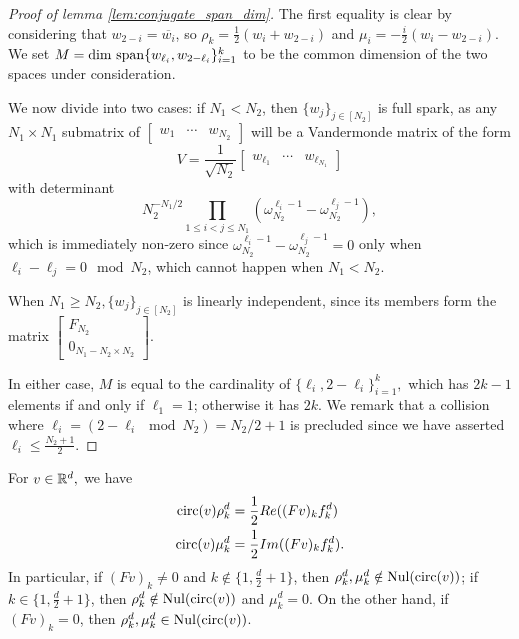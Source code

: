\begin{proof}[Proof of lemma \ref{lem:conjugate_span_dim}]

The first equality is clear by considering that $w_{2 - i} = \overline{w_i}$, so $\rho_k = \frac{1}{2}(w_i + w_{2-i})$ and $\mu_i = -\frac{i}{2}(w_i - w_{2 - i})$.  We set $M = \dim\,\operatorname{span}\{w_{\ell_i}, w_{2 - \ell_i}\}_{i = 1}^k$ to be the common dimension of the two spaces under consideration.

We now divide into two cases: if $N_1 < N_2$, then $\{w_j\}_{j \in [N_2]}$ is full spark, as any $N_1 \times N_1$ submatrix of $\begin{bmatrix} w_1 & \cdots & w_{N_2} \end{bmatrix}$ will be a Vandermonde matrix of the form \[V = \frac{1}{\sqrt{N_2}}\begin{bmatrix} w_{\ell_1} & \cdots & w_{\ell_{N_1}} \end{bmatrix}\] with determinant \[N_2^{-N_1 / 2}\prod_{1 \le i < j \le N_1} (\omega_{N_2}^{\ell_i - 1} - \omega_{N_2}^{\ell_j - 1}),\] which is immediately non-zero since $\omega_{N_2}^{\ell_i - 1} - \omega_{N_2}^{\ell_j - 1} = 0$ only when $\ell_i - \ell_j = 0 \mod N_2$, which cannot happen when $N_1 < N_2$.

When $N_1 \ge N_2, \{w_j\}_{j \in [N_2]}$ is linearly independent, since its members form the matrix $\begin{bmatrix} F_{N_2} \\ 0_{N_1 - N_2 \times N_2} \end{bmatrix}$.

In either case, $M$ is equal to the cardinality of $\{\ell_i, 2 - \ell_i\}_{i = 1}^k,$ which has $2k - 1$ elements if and only if $\ell_1 = 1$; otherwise it has $2k$.  We remark that a collision where $\ell_i = (2 - \ell_i \mod N_2) = N_2 / 2 + 1$ is precluded since we have asserted $\ell_i \le \frac{N_2 + 1}{2}$.

\end{proof}

\begin{lemma}
  For $v \in \mathbb{R}^d,$ we have \begin{align} \operatorname{circ}(v) \rho_k^d &= \frac{1}{2}Re((Fv)_k f_k^d) \label{eq:real_part} \\ \operatorname{circ}(v) \mu_k^d &= \frac{1}{2}Im((Fv)_k f_k^d) \label{eq:imag_part}. \end{align} In particular, if $(Fv)_k \neq 0$ and $k \notin \{1, \frac{d}{2} + 1\}$, then $\rho_k^d, \mu_k^d \notin \operatorname{Nul}(\operatorname{circ}(v))$; if $k \in \{1, \frac{d}{2} + 1\}$, then $\rho_k^d \notin \operatorname{Nul}(\operatorname{circ}(v))$ and $\mu_k^d = 0$.  On the other hand, if $(Fv)_k = 0$, then $\rho_k^d, \mu_k^d \in \operatorname{Nul}(\operatorname{circ}(v))$.  \label{lem:eigenbits}
\end{lemma}

